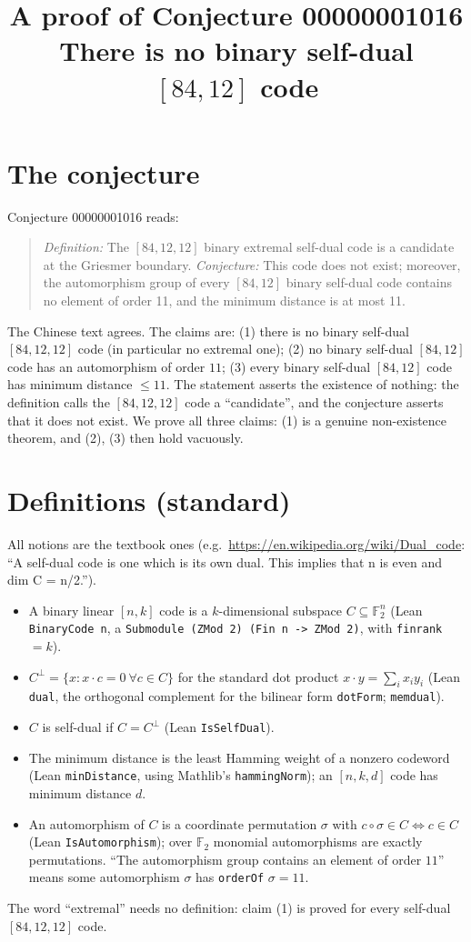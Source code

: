 \documentclass[11pt]{article}
\title{A proof of Conjecture 00000001016\\[2pt]
\large There is no binary self-dual $[84,12]$ code}
\date{}
\renewcommand{\_}{\oldus\allowbreak}
\theoremstyle{definition}
\theoremstyle{remark}
\begin{document}
\sloppy
\maketitle

\section{The conjecture}

Conjecture 00000001016 reads:
\begin{quote}
\emph{Definition:} The $[84,12,12]$ binary extremal self-dual code is a candidate at the Griesmer boundary.
\emph{Conjecture:} This code does not exist; moreover, the automorphism group of every $[84,12]$ binary
self-dual code contains no element of order 11, and the minimum distance is at most 11.
\end{quote}
The Chinese text agrees. The claims are:
(1) there is no binary self-dual $[84,12,12]$ code (in particular no extremal one);
(2) no binary self-dual $[84,12]$ code has an automorphism of order $11$;
(3) every binary self-dual $[84,12]$ code has minimum distance $\le 11$.
The statement asserts the existence of nothing: the definition calls the $[84,12,12]$ code a
``candidate'', and the conjecture asserts that it does not exist. We prove all three claims: (1) is a
genuine non-existence theorem, and (2), (3) then hold vacuously.

\section{Definitions (standard)}

All notions are the textbook ones (e.g.\ \url{https://en.wikipedia.org/wiki/Dual_code}: ``A self-dual code is
one which is its own dual. This implies that n is even and dim C = n/2.'').
\begin{itemize}[nosep]
\item A binary linear $[n,k]$ code is a $k$-dimensional subspace $C \subseteq \mathbb{F}_2^n$ (Lean
  \texttt{BinaryCode n}, a \texttt{Submodule (ZMod 2) (Fin n -> ZMod 2)}, with \texttt{finrank} $= k$).
\item $C^\perp = \{x : x \cdot c = 0 \ \forall c \in C\}$ for the standard dot product $x\cdot y=\sum_i x_iy_i$
  (Lean \texttt{dual}, the orthogonal complement for the bilinear form \texttt{dotForm}; \texttt{mem\_dual}).
\item $C$ is self-dual if $C = C^\perp$ (Lean \texttt{IsSelfDual}).
\item The minimum distance is the least Hamming weight of a nonzero codeword (Lean \texttt{minDistance},
  using Mathlib's \texttt{hammingNorm}); an $[n,k,d]$ code has minimum distance $d$.
\item An automorphism of $C$ is a coordinate permutation $\sigma$ with $c \circ \sigma \in C \iff c \in C$
  (Lean \texttt{IsAutomorphism}); over $\mathbb{F}_2$ monomial automorphisms are exactly permutations.
  ``The automorphism group contains an element of order $11$'' means some automorphism $\sigma$ has
  \texttt{orderOf} $\sigma = 11$.
\end{itemize}
The word ``extremal'' needs no definition: claim (1) is proved for every self-dual $[84,12,12]$ code.
\end{document}
